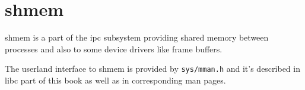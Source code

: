 \chapter{shmem}

\acf{shmem} is a part of the \ac{ipc} subsystem providing shared memory between
processes and also to some device drivers like frame buffers.

The userland interface to shmem is provided by \verb+sys/mman.h+ and it's
described in libc part of this book as well as in corresponding man pages.
